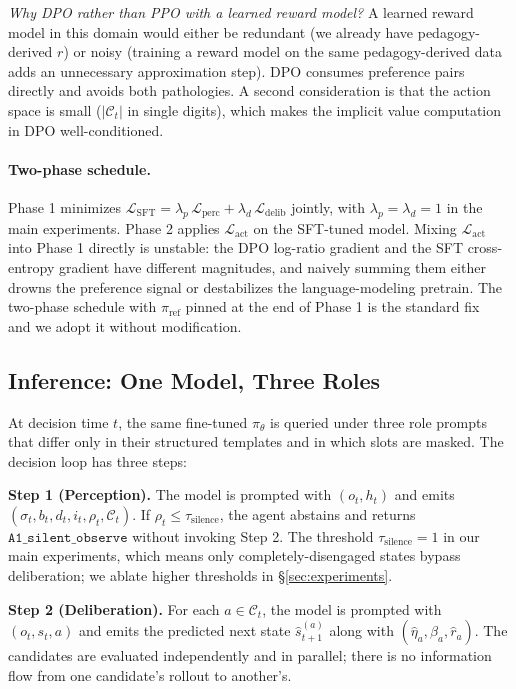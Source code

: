 \documentclass{article}
\begin{document}
\textit{Why DPO rather than PPO with a learned reward model?} A learned reward model in this domain would either be redundant (we already have pedagogy-derived $r$) or noisy (training a reward model on the same pedagogy-derived data adds an unnecessary approximation step). DPO consumes preference pairs directly and avoids both pathologies. A second consideration is that the action space is small ($|\mathcal{C}_t|$ in single digits), which makes the implicit value computation in DPO well-conditioned.

\paragraph{Two-phase schedule.}
Phase 1 minimizes $\mathcal{L}_\text{SFT} = \lambda_p\, \mathcal{L}_\text{perc} + \lambda_d\, \mathcal{L}_\text{delib}$ jointly, with $\lambda_p = \lambda_d = 1$ in the main experiments. Phase 2 applies $\mathcal{L}_\text{act}$ on the SFT-tuned model. Mixing $\mathcal{L}_\text{act}$ into Phase 1 directly is unstable: the DPO log-ratio gradient and the SFT cross-entropy gradient have different magnitudes, and naively summing them either drowns the preference signal or destabilizes the language-modeling pretrain. The two-phase schedule with $\pi_\text{ref}$ pinned at the end of Phase 1 is the standard fix~\cite{DPO,LLaVA15} and we adopt it without modification.

\subsection{Inference: One Model, Three Roles}
\label{sec:method:inference}

At decision time $t$, the same fine-tuned $\pi_\theta$ is queried under three role prompts that differ only in their structured templates and in which slots are masked. The decision loop has three steps:

\textbf{Step 1 (Perception).}
The model is prompted with $(o_t, h_t)$ and emits $(\sigma_t, b_t, d_t, i_t, \rho_t, \mathcal{C}_t)$. If $\rho_t \le \tau_\text{silence}$, the agent abstains and returns $\texttt{A1\_silent\_observe}$ without invoking Step 2. The threshold $\tau_\text{silence} = 1$ in our main experiments, which means only completely-disengaged states bypass deliberation; we ablate higher thresholds in §\ref{sec:experiments}.

\textbf{Step 2 (Deliberation).}
For each $a \in \mathcal{C}_t$, the model is prompted with $(o_t, s_t, a)$ and emits the predicted next state $\hat{s}_{t+1}^{(a)}$ along with $(\hat{\eta}_a, \hat{\beta}_a, \hat{r}_a)$. The candidates are evaluated independently and in parallel; there is no information flow from one candidate's rollout to another's.
\end{document}
